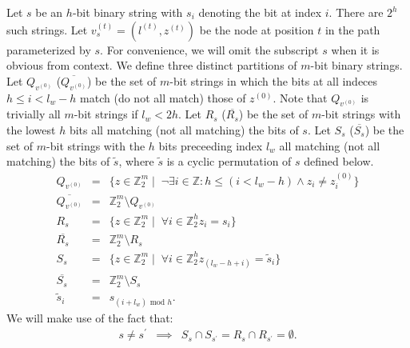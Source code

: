 \documentclass[prodmode,permissions]{acmsmall-ec16}
\newcommand{\beq}{\begin{eqnarray}}
\newcommand{\eeq}{\end{eqnarray}}
\begin{document}
Let $s$ be an $h$-bit binary string with $s_i$ denoting the bit at index $i$.
There are $2^h$ such strings.
Let $v_s^{(t)} = (l^{(t)}, z^{(t)})$ be the node at position $t$
in the path parameterized by $s$.
For convenience,
we will omit the subscript $s$ when it is obvious from context.
We define three distinct partitions of $m$-bit binary strings.
Let $Q_{v^{(0)}}$ ($\overline{Q_{v^{(0)}}}$) be the set of $m$-bit
strings in which the bits at
all indeces $h \leq i < l_w - h$ match (do not all match) those of $z^{(0)}$.
Note that $Q_{v^{(0)}}$ is trivially all $m$-bit strings if $l_w < 2h$.
Let $R_s$ ($\overline{R_s}$) be the set of $m$-bit strings with the lowest $h$
bits all matching (not all matching) the bits of $s$.
Let $S_s$ ($\overline{S_s}$) be the set of $m$-bit strings with the $h$ bits
preceeding index $l_w$ all matching (not all matching) the bits of $\tilde{s}$,
where $\tilde{s}$ is a cyclic permutation of $s$ defined below.
\beq
Q_{v^{(0)}} &=&
\{z \in \mathbb{Z}_2^m \mid \;
\neg \exists i \in \mathbb{Z} : h \leq (i < l_w - h) \land z_i \neq z_i^{(0)} \}
\\
\overline{Q_{v^{(0)}}} &=& \mathbb{Z}_2^m \setminus Q_{v^{(0)}}
\\
R_s &=&
\{z \in \mathbb{Z}_{2}^m \mid \;
\forall i \in \mathbb{Z}_2^h z_i = s_i \}
\\
\overline{R_s} &=& \mathbb{Z}_2^m \setminus R_s
\\
S_s &=&
\{z \in \mathbb{Z}_{2}^m \mid \;
\forall i \in \mathbb{Z}_2^h z_{(l_w - h + i)} = \tilde{s}_i \}
\\
\overline{S_s} &=& \mathbb{Z}_2^m \setminus S_s
\\
\tilde{s}_i &=& s_{(i + l_w) \text{ mod } h}.
\eeq
We will make use of the fact that:
\beq
s \neq s^\prime &\implies&
S_s \cap S_{s^\prime} = R_s \cap R_{s^\prime} = \emptyset.
\eeq
\end{document}
